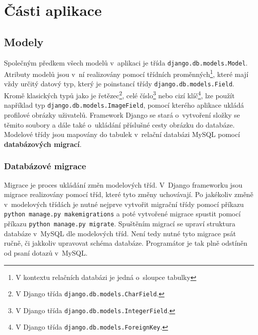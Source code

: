 \section{Části aplikace}

\subsection{Modely}
\begin{sloppypar}
Společným předkem všech modelů v~aplikaci je třída \texttt{django.db.models.Model}. Atributy modelů jsou v~ní realizovány pomocí třídních proměnných\footnote{V kontextu relačních databázi je jedná o~sloupce tabulky}, které mají vždy určitý datový typ, který je poinstancí třídy \texttt{django.db.models.Field}. Kromě klasických typů jako je řetězec\footnote{V Django třída \texttt{django.db.models.CharField}.}, celé číslo\footnote{V Django třída \texttt{django.db.models.IntegerField}.} nebo cizí klíč\footnote{V Django třída \texttt{django.db.models.ForeignKey}.}, lze použít například typ \texttt{django.db.models.ImageField}, pomocí kterého aplikace ukládá profilové obrázky uživatelů. Framework Django se stará o~vytvoření složky se těmito soubory a dále také o~ukládání příslušné cesty obrázku do databáze. Modelové třídy jsou mapovány do tabulek v~relační databázi MySQL pomocí \textbf{databázových migrací}.
\end{sloppypar}

\subsubsection{Databázové migrace}
Migrace je proces ukládání změn modelových tříd. V~Django frameworku jsou migrace realizovány pomocí tříd, které tyto změny uchovávají. Po jakékoliv změně v~modelových třídách je nutné nejprve vytvořit migrační třídy pomocí příkazu \mbox{\texttt{python manage.py makemigrations}} a poté vytvořené migrace spustit pomocí příkazu \mbox{\texttt{python manage.py migrate}}. Spuštěním migrací se upraví struktura databáze v~MySQL dle modelových tříd. Není tedy nutné tyto migrace psát ručně, či jakkoliv upravovat schéma databáze. Programátor je tak plně odstíněn od psaní dotazů v~MySQL.

